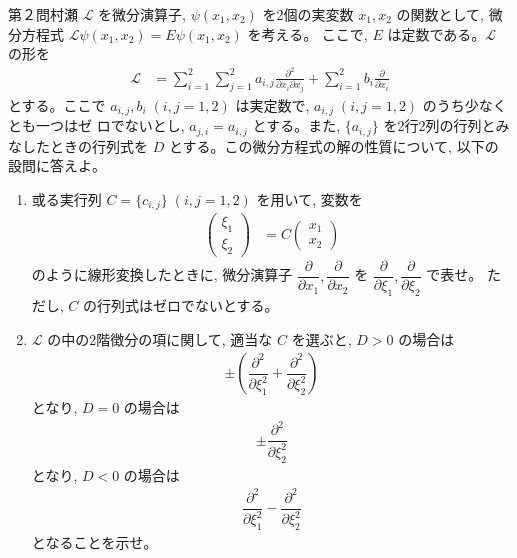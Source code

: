 \begin{question}{第２問}{村瀬}
$\mathcal{L}$ を微分演算子, $\psi(x_1,x_2)$ を2個の実変数 $x_1,x_2$ の関数として,
微分方程式 $\mathcal{L}\psi(x_1,x_2)=E\psi(x_1,x_2)$ を考える。
ここで, $E$ は定数である。$\mathcal{L}$ の形を
\begin{align*}
  \mathcal{L}
    &= \sum_{i=1}^2 \sum_{j=1}^2 a_{i,j} \frac{\partial^2}{\partial x_i \partial x_j}
     + \sum_{i=1}^2 b_i \frac{\partial}{\partial x_i}
\end{align*}
とする。ここで $a_{i,j},b_i\;(i,j=1,2)$ は実定数で, $a_{i,j}\;(i,j=1, 2)$ のうち少なくとも一つはゼ
ロでないとし, $a_{j,i}=a_{i,j}$ とする。また, $\{a_{i,j}\}$ を2行2列の行列とみなしたときの行列式を
$D$ とする。この微分方程式の解の性質について, 以下の設問に答えよ。

\begin{enumerate}
\item
  或る実行列 $C=\{c_{i,j}\}\; (i,j=1,2)$ を用いて, 変数を
  \begin{align*}
    \begin{pmatrix} \xi_1 \\ \xi_2 \end{pmatrix}
      &= C \begin{pmatrix} x_1 \\ x_2 \end{pmatrix}
  \end{align*}
  のように線形変換したときに, 微分演算子 $\dfrac{\partial}{\partial x_1}, \dfrac{\partial}{\partial x_2}$ を
  $\dfrac{\partial}{\partial \xi_1}, \dfrac{\partial}{\partial \xi_2}$ で表せ。
  ただし, $C$ の行列式はゼロでないとする。

\item
  $\mathcal{L}$ の中の2階徴分の項に関して, 適当な $C$ を選ぶと, $D>0$ の場合は
  \begin{align*}
    \pm\left(\dfrac{\partial^2}{\partial\xi_1^2} + \dfrac{\partial^2}{\partial \xi_2^2}\right)
  \end{align*}
  となり, $D=0$ の場合は
  \begin{align*}
    \pm\dfrac{\partial^2}{\partial\xi_2^2}
  \end{align*}
  となり, $D<0$ の場合は
  \begin{align*}
    \dfrac{\partial^2}{\partial\xi_1^2}
    - \dfrac{\partial^2}{\partial\xi_2^2}
  \end{align*}
  となることを示せ。


\end{enumerate}
\end{question}
